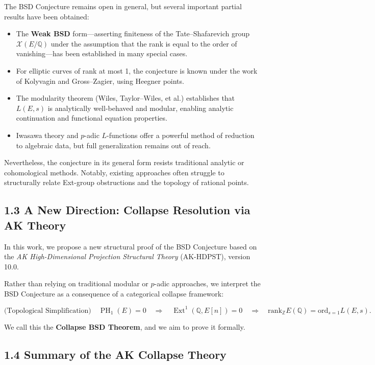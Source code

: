 \documentclass[11pt]{article}
\DeclareMathOperator{\Ext}{Ext}
\DeclareMathOperator{\PH}{PH}
\newcommand{\QQ}{\mathbb{Q}}
\newcommand{\ZZ}{\mathbb{Z}}
\newcommand{\Sha}{\mathcal{X}}
\begin{document}
The BSD Conjecture remains open in general, but several important partial results have been obtained:

\begin{itemize}
  \item The \textbf{Weak BSD} form—asserting finiteness of the Tate–Shafarevich group $\Sha(E/\QQ)$ under the assumption that the rank is equal to the order of vanishing—has been established in many special cases.
  \item For elliptic curves of rank at most 1, the conjecture is known under the work of Kolyvagin and Gross–Zagier, using Heegner points.
  \item The modularity theorem (Wiles, Taylor–Wiles, et al.) establishes that $L(E,s)$ is analytically well-behaved and modular, enabling analytic continuation and functional equation properties.
  \item Iwasawa theory and $p$-adic $L$-functions offer a powerful method of reduction to algebraic data, but full generalization remains out of reach.
\end{itemize}

Nevertheless, the conjecture in its general form resists traditional analytic or cohomological methods.  
Notably, existing approaches often struggle to structurally relate Ext-group obstructions and the topology of rational points.

\subsection{1.3 A New Direction: Collapse Resolution via AK Theory}

In this work, we propose a new structural proof of the BSD Conjecture based on the \emph{AK High-Dimensional Projection Structural Theory} (AK-HDPST), version 10.0.

Rather than relying on traditional modular or $p$-adic approaches, we interpret the BSD Conjecture as a consequence of a categorical collapse framework:

\[
\text{(Topological Simplification)} \quad \PH_1(E) = 0
\quad \Longrightarrow \quad
\Ext^1(\QQ,E[n]) = 0
\quad \Longrightarrow \quad
\mathrm{rank}_{\ZZ} E(\QQ) = \mathrm{ord}_{s=1} L(E,s).
\]

We call this the \textbf{Collapse BSD Theorem}, and we aim to prove it formally.

\subsection{1.4 Summary of the AK Collapse Theory}
\end{document}
